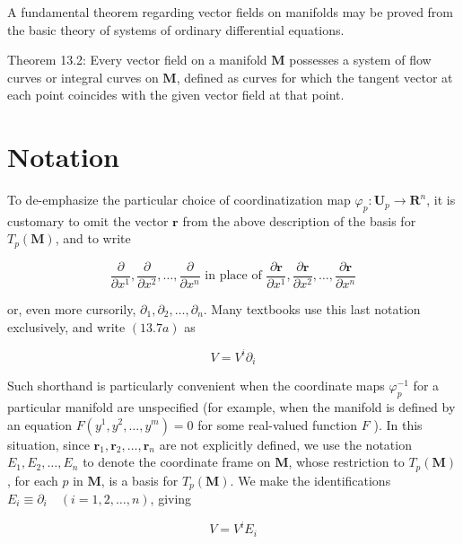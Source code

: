 \documentclass[10pt]{article}
\begin{document}
A fundamental theorem regarding vector fields on manifolds may be proved from the basic theory of systems of ordinary differential equations.

Theorem 13.2: Every vector field on a manifold $\mathbf{M}$ possesses a system of flow curves or integral curves on $\mathbf{M}$, defined as curves for which the tangent vector at each point coincides with the given vector field at that point.

\section*{Notation}
To de-emphasize the particular choice of coordinatization map $\varphi_{p}: \mathbf{U}_{p} \rightarrow \mathbf{R}^{n}$, it is customary to omit the vector $\mathbf{r}$ from the above description of the basis for $T_{p}(\mathbf{M})$, and to write

$$
\frac{\partial}{\partial x^{1}}, \frac{\partial}{\partial x^{2}}, \ldots, \frac{\partial}{\partial x^{n}} \text { in place of } \frac{\partial \mathbf{r}}{\partial x^{1}}, \frac{\partial \mathbf{r}}{\partial x^{2}}, \ldots, \frac{\partial \mathbf{r}}{\partial x^{n}}
$$

or, even more cursorily, $\partial_{1}, \partial_{2}, \ldots, \partial_{n}$. Many textbooks use this last notation exclusively, and write $(13.7 a)$ as


\begin{equation*}
V=V^{i} \partial_{i} \tag{13.7b}
\end{equation*}


Such shorthand is particularly convenient when the coordinate maps $\varphi_{p}^{-1}$ for a particular manifold are unspecified (for example, when the manifold is defined by an equation $F\left(y^{1}, y^{2}, \ldots, y^{m}\right)=0$ for some real-valued function $F$ ). In this situation, since $\mathbf{r}_{1}, \mathbf{r}_{2}, \ldots, \mathbf{r}_{n}$ are not explicitly defined, we use the notation $E_{1}, E_{2}, \ldots, E_{n}$ to denote the coordinate frame on $\mathbf{M}$, whose restriction to $T_{p}(\mathbf{M})$, for each $p$ in $\mathbf{M}$, is a basis for $T_{p}(\mathbf{M})$. We make the identifications $E_{i} \equiv \partial_{i} \quad(i=1,2, \ldots, n)$, giving


\begin{equation*}
V=V^{i} E_{i} \tag{13.7c}
\end{equation*}
\end{document}
